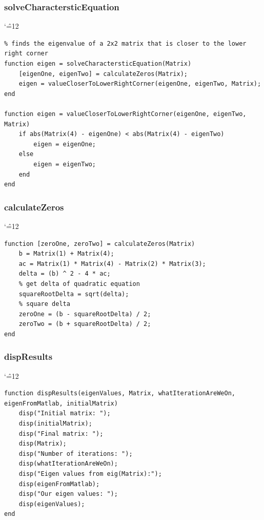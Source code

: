 \documentclass[12pt]{report}
\newenvironment{simplechar}{%
   \catcode`\^=12
}{}
\begin{document}
\subsubsection{solveCharactersticEquation}
\begin{simplechar}
\begin{lstlisting}
% finds the eigenvalue of a 2x2 matrix that is closer to the lower right corner
function eigen = solveCharactersticEquation(Matrix)
    [eigenOne, eigenTwo] = calculateZeros(Matrix);
    eigen = valueCloserToLowerRightCorner(eigenOne, eigenTwo, Matrix);
end

function eigen = valueCloserToLowerRightCorner(eigenOne, eigenTwo, Matrix)
    if abs(Matrix(4) - eigenOne) < abs(Matrix(4) - eigenTwo)
        eigen = eigenOne;
    else
        eigen = eigenTwo;
    end
end
\end{lstlisting}
\end{simplechar}

\subsubsection{calculateZeros}
\begin{simplechar}
\begin{lstlisting}
function [zeroOne, zeroTwo] = calculateZeros(Matrix)
    b = Matrix(1) + Matrix(4);
    ac = Matrix(1) * Matrix(4) - Matrix(2) * Matrix(3);
    delta = (b) ^ 2 - 4 * ac;
    % get delta of quadratic equation
    squareRootDelta = sqrt(delta);
    % square delta
    zeroOne = (b - squareRootDelta) / 2;
    zeroTwo = (b + squareRootDelta) / 2;
end
\end{lstlisting}
\end{simplechar}

\subsubsection{dispResults}
\begin{simplechar}
\begin{lstlisting}
function dispResults(eigenValues, Matrix, whatIterationAreWeOn, eigenFromMatlab, initialMatrix)
    disp("Initial matrix: ");
    disp(initialMatrix);
    disp("Final matrix: ");
    disp(Matrix);
    disp("Number of iterations: ");
    disp(whatIterationAreWeOn);
    disp("Eigen values from eig(Matrix):");
    disp(eigenFromMatlab);
    disp("Our eigen values: ");
    disp(eigenValues);
end
\end{lstlisting}
\end{simplechar}
\end{document}
